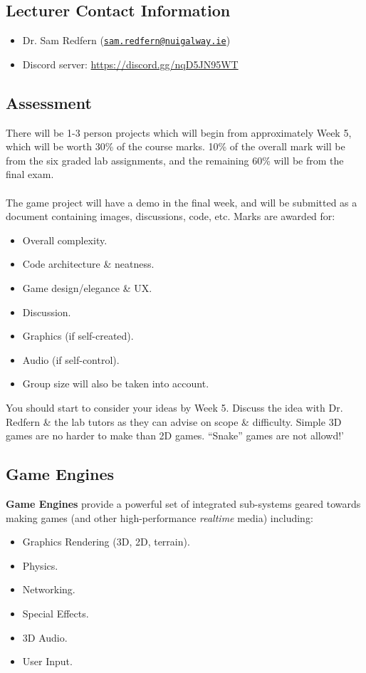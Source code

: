\documentclass[a4paper,11pt]{article}
\begin{document}
\subsection{Lecturer Contact Information}
\begin{itemize}
    \item   Dr. Sam Redfern (\href{mailto://sam.redfern@nuigalway.ie}{\texttt{sam.redfern@nuigalway.ie}})
    \item   Discord server: \url{https://discord.gg/nqD5JN95WT}
\end{itemize}

\subsection{Assessment}
There will be 1-3 person projects which will begin from approximately Week 5, which will be worth 30\% of the course marks.
10\% of the overall mark will be from the six graded lab assignments, and the remaining 60\% will be from the final exam.
\\\\ 
The game project will have a demo in the final week, and will be submitted as a document containing images, discussions, 
code, etc. 
Marks are awarded for:
\begin{itemize}
    \item   Overall complexity.
    \item   Code architecture \& neatness. 
    \item   Game design/elegance \& UX. 
    \item   Discussion.
    \item   Graphics (if self-created).
    \item   Audio (if self-control).
    \item   Group size will also be taken into account.
\end{itemize}

You should start to consider your ideas by Week 5. 
Discuss the idea with Dr. Redfern \& the lab tutors as they can advise on scope \& difficulty.
Simple 3D games are no harder to make than 2D games. 
``Snake'' games are not allowd!'


\subsection{Game Engines}
\textbf{Game Engines} provide a powerful set of integrated sub-systems geared towards making games (and other high-performance
\emph{realtime} media) including:
\begin{itemize}
    \item   Graphics Rendering (3D, 2D, terrain).
    \item   Physics.
    \item   Networking.
    \item   Special Effects. 
    \item   3D Audio.
    \item   User Input.
\end{itemize}
\end{document}
